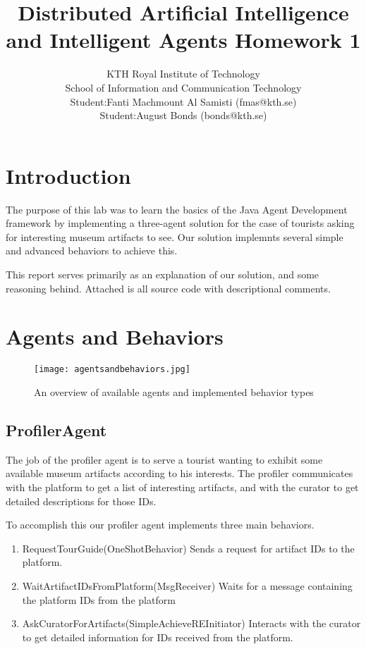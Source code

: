 \documentclass[a4paper, 11pt]{article}
\title{\textbf{Distributed Artificial Intelligence and Intelligent Agents Homework 1}}
\author{KTH Royal Institute of Technology \\ 
		School of Information and Communication Technology \\
		Student:Fanti Machmount Al Samisti (fmas@kth.se) \\
		Student:August Bonds (bonds@kth.se)}
\begin{document}
	
\maketitle

\section{Introduction}
The purpose of this lab was to learn the basics of the Java Agent Development framework by implementing a three-agent solution for the case of tourists asking for interesting museum artifacts to see. Our solution implemnts several simple and advanced behaviors to achieve this. 

This report serves primarily as an explanation of our solution, and some reasoning behind. Attached is all source code with descriptional comments.

\section{Agents and Behaviors}
\begin{figure}
	\begin{center}
		\texttt{[image: agentsandbehaviors.jpg]}
		\caption{An overview of available agents and implemented behavior types}
		\label{fig:results1}
	\end{center}
\end{figure}
\subsection{ProfilerAgent}
The job of the profiler agent is to serve a tourist wanting to exhibit some available museum artifacts according to his interests. The profiler communicates with the platform to get a list of interesting artifacts, and with the curator to get detailed descriptions for those IDs.

To accomplish this our profiler agent implements three main behaviors.
\begin{enumerate}
\item RequestTourGuide(OneShotBehavior) Sends a request for artifact IDs to the platform.
\item WaitArtifactIDsFromPlatform(MsgReceiver) Waits for a message containing the platform IDs from the platform
\item AskCuratorForArtifacts(SimpleAchieveREInitiator) Interacts with the curator to get detailed information for IDs received from the platform.
\end{enumerate}
\end{document}
